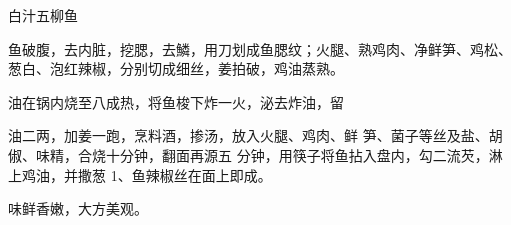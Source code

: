 \begin{recipe}{白汁五柳鱼}

\ingredients


\cooking

\step 鱼破腹，去内脏，挖腮，去鱗，用刀划成鱼腮纹；火腿、熟鸡肉、净鲜笋、鸡松、葱白、泡红辣椒，分别切成细丝，姜拍破，鸡油蒸熟。

\step 油在锅内烧至八成热，将鱼梭下炸一火，泌去炸油，留

油二两，加姜一跑，烹料酒，掺汤，放入火腿、鸡肉、鲜 笋、菌子等丝及盐、胡俶、味精，合烧十分钟，翻面再源五 分钟，用筷子将鱼拈入盘内，勾二流芡，淋上鸡油，并撒葱 1、鱼辣椒丝在面上即成。

\notes

味鲜香嫩，大方美观。

\end{recipe}

